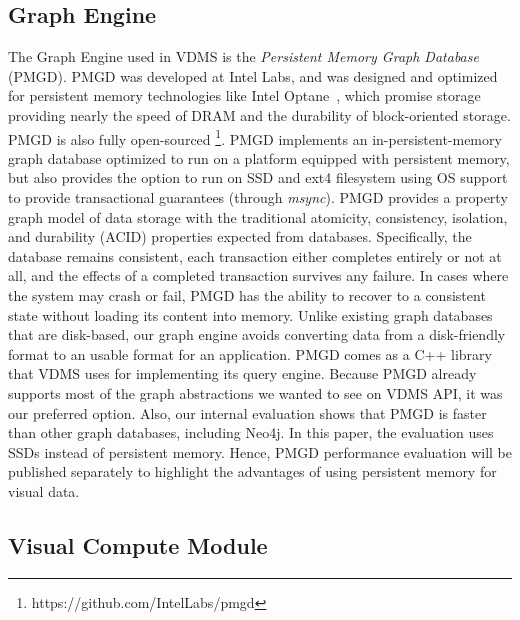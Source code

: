 \subsection{Graph Engine}

The Graph Engine used in VDMS is the
\textit{Persistent Memory Graph Database} (PMGD).
PMGD was developed at Intel Labs, and was designed and optimized for
persistent memory technologies like Intel Optane~\cite{IntelXPoint15}, which
promise storage providing nearly the speed of DRAM and the
durability of block-oriented storage.
PMGD is also fully open-sourced \footnote{https://github.com/IntelLabs/pmgd}.
PMGD implements an in-persistent-memory graph database optimized
to run on a platform equipped with persistent memory, but
also provides the option to run on SSD and ext4 filesystem
using OS support to provide transactional guarantees (through \textit{msync}).
PMGD provides a property graph model of data storage with the traditional
atomicity, consistency, isolation, and durability
(ACID) properties expected from databases.
Specifically, the database remains consistent, each transaction either
completes entirely or not at all, and the effects of a completed transaction
survives any failure.
In cases where the system may crash or fail, PMGD has the ability
to recover to a consistent state without loading its content into memory.
Unlike existing graph databases that are disk-based, our graph engine
avoids converting data from a disk-friendly format to an usable format for an application.
PMGD comes as a C++ library that VDMS uses for implementing its query engine.
Because PMGD already supports most of the graph abstractions we wanted
to see on VDMS API, it was our preferred option.
Also, our internal evaluation shows that PMGD is faster
than other graph databases, including Neo4j\cite{miller2013graph}.
In this paper, the evaluation uses SSDs instead of persistent memory.
Hence, PMGD performance evaluation will be published separately to highlight
the advantages of using persistent memory for visual data.

\subsection{Visual Compute Module}


